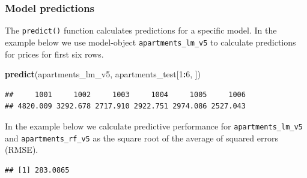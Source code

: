 \documentclass[12pt,]{krantz}
\newenvironment{Shaded}{\begin{snugshade}}{\end{snugshade}}
\newcommand{\DecValTok}[1]{\textcolor[rgb]{0.00,0.00,0.81}{#1}}
\newcommand{\KeywordTok}[1]{\textcolor[rgb]{0.13,0.29,0.53}{\textbf{#1}}}
\newcommand{\NormalTok}[1]{#1}
\newcommand{\OperatorTok}[1]{\textcolor[rgb]{0.81,0.36,0.00}{\textbf{#1}}}
\newcommand{\StringTok}[1]{\textcolor[rgb]{0.31,0.60,0.02}{#1}}
\begin{document}
\hypertarget{predictionsApartments}{%
\subsubsection{Model predictions}\label{predictionsApartments}}

The \texttt{predict()} function calculates predictions for a specific model. In the example below we use model-object \texttt{apartments\_lm\_v5} to calculate predictions for prices for first six rows.

\begin{Shaded}
\begin{Highlighting}[]
\KeywordTok{predict}\NormalTok{(apartments_lm_v5, apartments_test[}\DecValTok{1}\OperatorTok{:}\DecValTok{6}\NormalTok{, ])}
\end{Highlighting}
\end{Shaded}

\begin{verbatim}
##     1001     1002     1003     1004     1005     1006 
## 4820.009 3292.678 2717.910 2922.751 2974.086 2527.043
\end{verbatim}

In the example below we calculate predictive performance for \texttt{apartments\_lm\_v5} and \texttt{apartments\_rf\_v5} as the square root of the average of squared errors (RMSE).

\begin{Shaded}
\end{Shaded}

\begin{verbatim}
## [1] 283.0865
\end{verbatim}

\begin{Shaded}
\end{Shaded}
\end{document}
